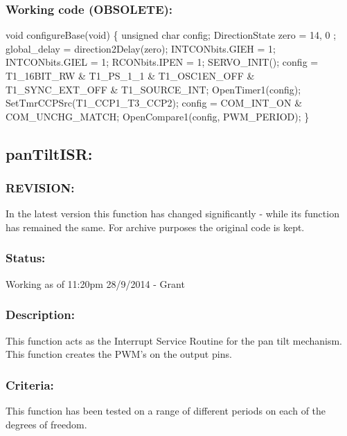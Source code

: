 \documentclass[]{report}
\begin{document}
\subsubsection{Working code (OBSOLETE):}
void configureBase(void) \newline
\{ \newline
unsigned char config; \newline
DirectionState zero = { 14, 0 }; \newline
global\_delay = direction2Delay(zero);\newline
INTCONbits.GIEH = 1;\newline
INTCONbits.GIEL = 1;\newline
RCONbits.IPEN = 1;\newline
SERVO\_INIT();\newline
config = T1\_16BIT\_RW \& T1\_PS\_1\_1 \& T1\_OSC1EN\_OFF \& T1\_SYNC\_EXT\_OFF \& T1\_SOURCE\_INT; \newline
OpenTimer1(config);\newline
SetTmrCCPSrc(T1\_CCP1\_T3\_CCP2);\newline
config = COM\_INT\_ON \& COM\_UNCHG\_MATCH;\newline
OpenCompare1(config, PWM\_PERIOD);\newline
\}

\subsection{panTiltISR:}
\subsubsection{REVISION:}
In the latest version this function has changed significantly - while its function has remained the same. For archive purposes the original code is kept.

\subsubsection{Status:}
Working as of 11:20pm 28/9/2014 - Grant

\subsubsection{Description:}
This function acts as the Interrupt Service Routine for the pan tilt mechanism. This function creates the PWM's on the output pins.

\subsubsection{Criteria:}
This function has been tested on a range of different periods on each of the degrees of freedom.
\end{document}
